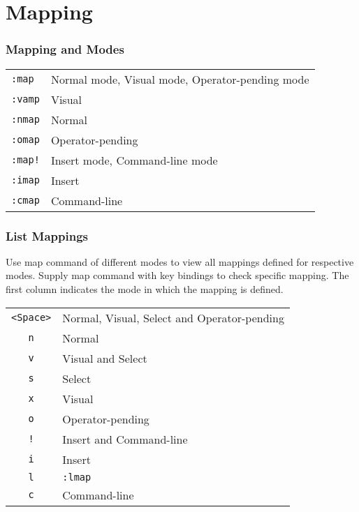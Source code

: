 \documentclass{article}
\begin{document}
\part{Mapping}
\section{Mapping and Modes}
\begin{table}
  \centering
  \begin{tabular}{ll}
    \verb|:map|&Normal mode, Visual mode, Operator-pending mode\\
    \verb|:vamp|&Visual\\
    \verb|:nmap|&Normal\\
    \verb|:omap|&Operator-pending\\
    \verb|:map!|&Insert mode, Command-line mode\\
    \verb|:imap|&Insert\\
    \verb|:cmap|&Command-line
  \end{tabular}
\end{table}
\section{List Mappings}
Use map command of different modes to view all mappings defined for respective modes. Supply map command with key bindings to check specific mapping. The first column indicates the mode in which the mapping is defined.
\begin{table}
  \centering
  \begin{tabular}{cl}
    \verb|<Space>|&Normal, Visual, Select and Operator-pending\\
    \verb|n|&Normal\\
    \verb|v|&Visual and Select\\
    \verb|s|&Select\\
    \verb|x|&Visual\\
    \verb|o|&Operator-pending\\
    \verb|!|&Insert and Command-line\\
    \verb|i|&Insert\\
    \verb|l|&\verb|:lmap|\\
    \verb|c|&Command-line
  \end{tabular}
\end{table}
\end{document}
